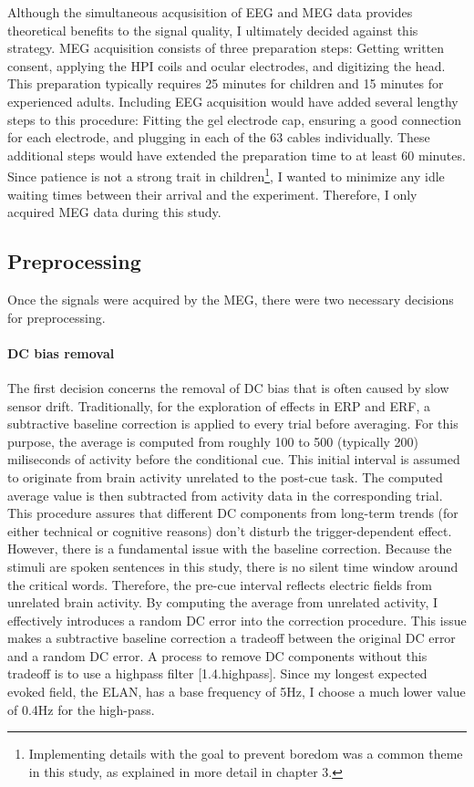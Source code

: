 Although the simultaneous acqusisition of EEG and MEG data provides theoretical benefits to the signal quality, I ultimately decided against this strategy.
MEG acquisition consists of three preparation steps: Getting written consent, applying the HPI coils and ocular electrodes, and digitizing the head.
This preparation typically requires 25 minutes for children and 15 minutes for experienced adults.
Including EEG acquisition would have added several lengthy steps to this procedure: Fitting the gel electrode cap, ensuring a good connection for each electrode, and plugging in each of the 63 cables individually.
These additional steps would have extended the preparation time to at least 60 minutes.
Since patience is not a strong trait in children\footnote{Implementing details with the goal to prevent boredom was a common theme in this study, as explained in more detail in chapter 3.}, I wanted to minimize any idle waiting times between their arrival and the experiment.
Therefore, I only acquired MEG data during this study.

\subsection{Preprocessing}

Once the signals were acquired by the MEG, there were two necessary decisions for preprocessing.

\paragraph{DC bias removal}
The first decision concerns the removal of DC bias that is often caused by slow sensor drift.
Traditionally, for the exploration of effects in ERP and ERF, a subtractive baseline correction is applied to every trial before averaging.
For this purpose, the average is computed from roughly 100 to 500 (typically 200) miliseconds of activity before the conditional cue.
This initial interval is assumed to originate from brain activity unrelated to the post-cue task.
The computed average value is then subtracted from activity data in the corresponding trial.
This procedure assures that different DC components from long-term trends (for either technical or cognitive reasons) don't disturb the trigger-dependent effect.
However, there is a fundamental issue with the baseline correction.
Because the stimuli are spoken sentences in this study, there is no silent time window around the critical words.
Therefore, the pre-cue interval reflects electric fields from unrelated brain activity.
By computing the average from unrelated activity, I effectively introduces a random DC error into the correction procedure.
This issue makes a subtractive baseline correction a tradeoff between the original DC error and a random DC error.
A process to remove DC components without this tradeoff is to use a highpass filter [1.4.highpass].
Since my longest expected evoked field, the ELAN, has a base frequency of 5Hz, I choose a much lower value of 0.4Hz for the high-pass.

